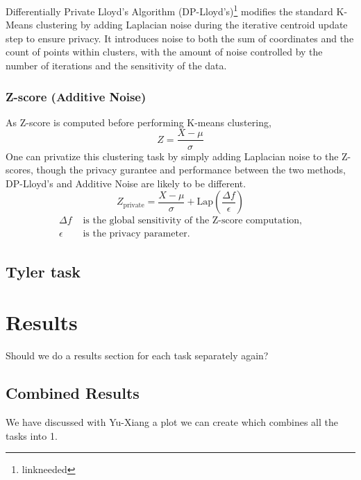 \documentclass[12pt,letterpaper]{article}
\begin{document}
Differentially Private Lloyd's Algorithm (DP-Lloyd's)\footnote{linkneeded} modifies the standard K-Means clustering by adding Laplacian noise during the iterative centroid update step to ensure privacy. It introduces noise to both the sum of coordinates and the count of points within clusters, with the amount of noise controlled by the number of iterations and the sensitivity of the data. 
\subsubsection{Z-score (Additive Noise)}
As Z-score is computed before performing K-means clustering, 
\[
Z = \frac{X - \mu}{\sigma}
\]
One can privatize this clustering task by simply adding Laplacian noise to the Z-scores, though the privacy gurantee and performance between the two methods, DP-Lloyd's and Additive Noise are likely to be different.
\[
Z_{\text{private}} = \frac{X - \mu}{\sigma} + \text{Lap}\left(\frac{\Delta f}{\epsilon}\right)
\]
\begin{equation*}
\begin{aligned}
    \Delta f & \text{ is the global sensitivity of the Z-score computation,} \\
    \epsilon & \text{ is the privacy parameter.}
\end{aligned}
\end{equation*}



\subsection{Tyler task}





\section{Results}

Should we do a results section for each task separately again?


\subsection{Combined Results}

We have discussed with Yu-Xiang a plot we can create which combines all the tasks into 1. 


\end{document}
